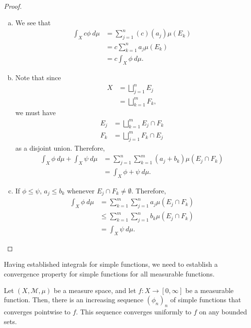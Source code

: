 \documentclass[10pt]{mypackage}
\begin{document}
\begin{proof}\hfill
  \begin{enumerate}[(a)]
    \item We see that
      \begin{align*}
        \int_{X}^{} c\phi\:d\mu &= \sum_{j=1}^{n}(c)\left( a_j \right)\mu\left( E_k \right)\\
                                &= c\sum_{k=1}^{n}a_j\mu\left( E_k \right)\\
                                &= c \int_{X}^{} \phi\:d\mu.
      \end{align*}
    \item Note that since
      \begin{align*}
        X &= \bigsqcup_{j=1}^{n}E_j\\
          &= \bigsqcup_{k=1}^{m}F_k,
      \end{align*}
      we must have
      \begin{align*}
        E_j &= \bigsqcup_{k=1}^{m}E_j\cap F_k\\
        F_k &= \bigsqcup_{j=1}^{m}F_k\cap E_j
      \end{align*}
      as a disjoint union. Therefore,
      \begin{align*}
        \int_{X}^{} \phi\:d\mu + \int_{X}^{} \psi\:d\mu &= \sum_{j=1}^{n}\sum_{k=1}^{m}\left( a_j + b_k \right)\mu\left( E_j\cap F_k \right)\\
                                                        &= \int_{X}^{} \phi + \psi\:d\mu.
      \end{align*}
    \item If $\phi\leq \psi$, $a_j\leq b_k$ whenever $E_j\cap F_k\neq \emptyset$. Therefore,
      \begin{align*}
        \int_{X}^{} \phi\:d\mu &= \sum_{k=1}^{m}\sum_{j=1}^{n}a_j\mu\left( E_j\cap F_k \right)\\
                               &\leq \sum_{k=1}^{m}\sum_{j=1}^{n}b_k\mu\left( E_j\cap F_k \right)\\
                               &= \int_{X}^{} \psi\:d\mu.
      \end{align*}
  \end{enumerate}
\end{proof}
Having established integrals for simple functions, we need to establish a convergence property for simple functions for all measurable functions.
\begin{theorem}
  Let $\left( X,\mathcal{M},\mu \right)$ be a measure space, and let $f\colon X\rightarrow [0,\infty]$ be a measurable function. Then, there is an increasing sequence $\left( \phi_n \right)_n$ of simple functions that converges pointwise to $f$. This sequence converges uniformly to $f$ on any bounded sets.
\end{theorem}
\end{document}
